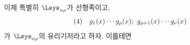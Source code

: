 
이제 특별히 $\Lsys_{n\rho}$가 선형족이고,
\[
\begin{array}{@{}l@{\quad}c@{}}
(4)&g_1(x)\cdots g_\rho(x);\ g_{\rho+1}(x)\cdots g_\nu(x)
\end{array}
\]
가 $\Lsys_{n\rho}$의 유리기저라고 하자. 이를테면
